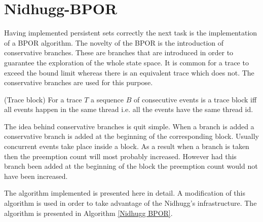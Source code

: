 \section{Nidhugg-BPOR}
Having implemented persistent sets correctly the next task is the implementation of a BPOR algorithm. The novelty of the BPOR is the introduction of conservative branches. These
are branches that are introduced in order to guarantee the exploration of the whole state space. It is common for a trace to exceed the bound limit whereas there is
an equivalent trace which does not. The conservative branches are used for this purpose.

\begin{definition}{(Trace block)}
For a trace $T$ a sequence $B$ of consecutive events is a trace block iff all events happen in the same thread i.e. all the events have the same thread id.
\end{definition}

The idea behind conservative branches is quit simple. When a branch is added a conservative branch is added at the beginning of the corresponding block.
Usually concurrent events take place inside a block. As a result when a branch is taken then the preemption count will most probably increased. However had this
branch been added at the beginning of the block the preemption count would not have been increased. 

The algorithm implemented is presented here \cite{BPOR} in detail. A modification of this algorithm is used in order to take advantage of the Nidhugg's infrastructure.
The algorithm is presented in Algorithm \ref{Nidhugg BPOR}.

